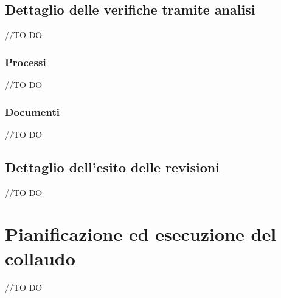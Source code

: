 \documentclass[12pt,a4paper]{article}
\begin{document}
\subsection{Dettaglio delle verifiche tramite analisi}
//TO DO
\subsubsection{Processi}
//TO DO
\subsubsection{Documenti}
//TO DO
\subsection{Dettaglio dell'esito delle revisioni}
//TO DO
\newpage
\section{Pianificazione ed esecuzione del collaudo}
//TO DO
\end{document}
